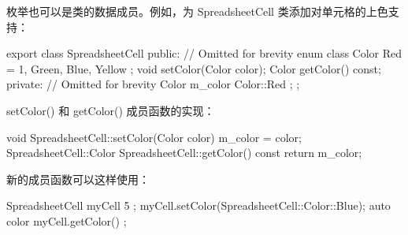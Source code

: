 枚举也可以是类的数据成员。例如，为 SpreadsheetCell 类添加对单元格的上色支持：

\begin{cpp}
export class SpreadsheetCell
{
    public:
        // Omitted for brevity
        enum class Color { Red = 1, Green, Blue, Yellow };
        void setColor(Color color);
        Color getColor() const;
    private:
        // Omitted for brevity
        Color m_color { Color::Red };
};
\end{cpp}

setColor() 和 getColor() 成员函数的实现：

\begin{cpp}
void SpreadsheetCell::setColor(Color color) { m_color = color; }
SpreadsheetCell::Color SpreadsheetCell::getColor() const { return m_color; }
\end{cpp}

新的成员函数可以这样使用：

\begin{cpp}
SpreadsheetCell myCell { 5 };
myCell.setColor(SpreadsheetCell::Color::Blue);
auto color { myCell.getColor() };
\end{cpp}






















